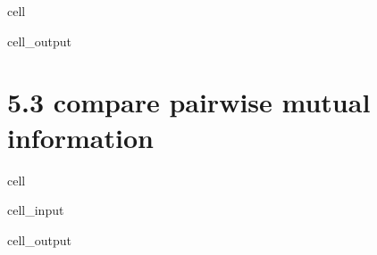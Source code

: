 \documentclass[letterpaper,10pt,english]{jupyterBook}
\begin{document}
\begin{sphinxuseclass}{cell}
\begin{sphinxVerbatimOutput}
\begin{sphinxuseclass}{cell_output}
\noindent{}

\noindent{}

\noindent{}

\noindent{}

\noindent{}

\noindent{}

\end{sphinxuseclass}\end{sphinxVerbatimOutput}

\end{sphinxuseclass}

\section{5.3 compare pairwise mutual information}
\label{\detokenize{src/test/SynthNAV0:id15}}
\begin{sphinxuseclass}{cell}\begin{sphinxVerbatimInput}

\begin{sphinxuseclass}{cell_input}
\begin{sphinxVerbatim}[commandchars=\\\{\}]
\end{sphinxVerbatim}

\end{sphinxuseclass}\end{sphinxVerbatimInput}
\begin{sphinxVerbatimOutput}

\begin{sphinxuseclass}{cell_output}
\noindent{}

\end{sphinxuseclass}\end{sphinxVerbatimOutput}

\end{sphinxuseclass}
\end{document}
